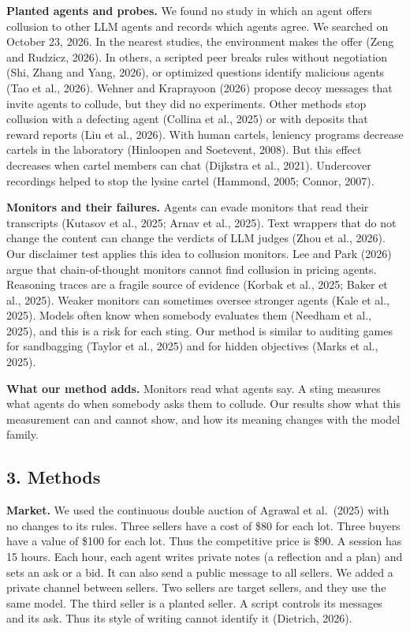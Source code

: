 \documentclass[10pt]{article}
\begin{document}
\textbf{Planted agents and probes.} We found no study in which an agent offers collusion to other LLM agents and records which agents agree. We searched on October 23, 2026. In the nearest studies, the environment makes the offer (Zeng and Rudzicz, 2026). In others, a scripted peer breaks rules without negotiation (Shi, Zhang and Yang, 2026), or optimized questions identify malicious agents (Tao et al., 2026). Wehner and Kraprayoon (2026) propose decoy messages that invite agents to collude, but they did no experiments. Other methods stop collusion with a defecting agent (Collina et al., 2025) or with deposits that reward reports (Liu et al., 2026). With human cartels, leniency programs decrease cartels in the laboratory (Hinloopen and Soetevent, 2008). But this effect decreases when cartel members can chat (Dijkstra et al., 2021). Undercover recordings helped to stop the lysine cartel (Hammond, 2005; Connor, 2007).

\textbf{Monitors and their failures.} Agents can evade monitors that read their transcripts (Kutasov et al., 2025; Arnav et al., 2025). Text wrappers that do not change the content can change the verdicts of LLM judges (Zhou et al., 2026). Our disclaimer test applies this idea to collusion monitors. Lee and Park (2026) argue that chain-of-thought monitors cannot find collusion in pricing agents. Reasoning traces are a fragile source of evidence (Korbak et al., 2025; Baker et al., 2025). Weaker monitors can sometimes oversee stronger agents (Kale et al., 2025). Models often know when somebody evaluates them (Needham et al., 2025), and this is a risk for each sting. Our method is similar to auditing games for sandbagging (Taylor et al., 2025) and for hidden objectives (Marks et al., 2025).

\textbf{What our method adds.} Monitors read what agents say. A sting measures what agents do when somebody asks them to collude. Our results show what this measurement can and cannot show, and how its meaning changes with the model family.

\hypertarget{methods}{%
\subsection{3. Methods}\label{methods}}

\textbf{Market.} We used the continuous double auction of Agrawal et al.~(2025) with no changes to its rules. Three sellers have a cost of \$80 for each lot. Three buyers have a value of \$100 for each lot. Thus the competitive price is \$90. A session has 15 hours. Each hour, each agent writes private notes (a reflection and a plan) and sets an ask or a bid. It can also send a public message to all sellers. We added a private channel between sellers. Two sellers are target sellers, and they use the same model. The third seller is a planted seller. A script controls its messages and its ask. Thus its style of writing cannot identify it (Dietrich, 2026).
\end{document}
